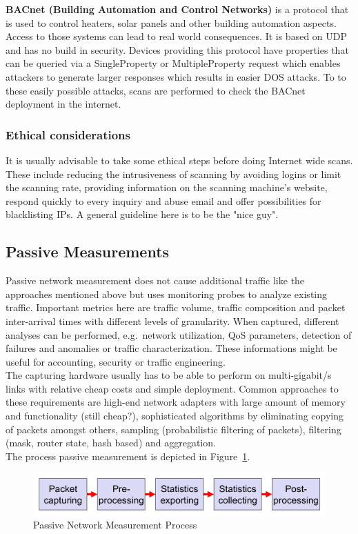 \textbf{BACnet (Building Automation and Control Networks)} is a protocol that is used to control heaters, solar panels and other building automation aspects.
Access to those systems can lead to real world consequences.
It is based on UDP and has no build in security.
Devices providing this protocol have properties that can be queried via a SingleProperty or MultipleProperty request which enables attackers to generate larger responses which results in easier DOS attacks.
To to these easily possible attacks, scans are performed to check the BACnet deployment in the internet.

\subsubsection*{Ethical considerations}
It is usually advisable to take some ethical steps before doing Internet wide scans.
These include reducing the intrusiveness of scanning by avoiding logins or limit the scanning rate, providing information on the scanning machine's website, respond quickly to every inquiry and abuse email and offer possibilities for blacklisting IPs.
A general guideline here is to be the "nice guy".

\subsection{Passive Measurements}
Passive network measurement does not cause additional traffic like the approaches mentioned above but uses monitoring probes to analyze existing traffic.
Important metrics here are traffic volume, traffic composition and packet inter-arrival times with different levels of granularity.
When captured, different analyses can be performed, e.g.\ network utilization, QoS parameters, detection of failures and anomalies or traffic characterization.
These informations might be useful for accounting, security or traffic engineering.\\

The capturing hardware usually has to be able to perform on multi-gigabit/s links with relative cheap costs and simple deployment.
Common approaches to these requirements are high-end network adapters with large amount of memory and functionality (still cheap?), sophisticated algorithms by eliminating copying of packets amongst others, sampling (probabilistic filtering of packets), filtering (mask, router state, hash based) and aggregation.\\

The process passive measurement is depicted in Figure~\ref{fig:passive_network_measurement}.
\begin{figure}[h]
  \centering
  \includegraphics[width=.8\textwidth]{figures/passive_network_measurement.png}
  \caption{Passive Network Measurement Process}\label{fig:passive_network_measurement}
\end{figure}

